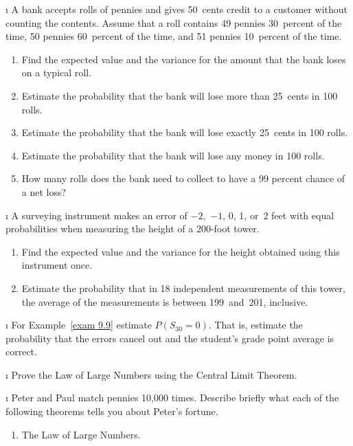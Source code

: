 \begin{LJSItem}
\i\label{exer 9.2.105}  A bank accepts rolls of pennies and gives 50~cents credit to a customer
without counting the contents.  Assume that a roll contains 49 pennies
30~percent of the time, 50 pennies 60~percent of the time, and 51 pennies
10~percent of the time.
\begin{enumerate}
\item  Find the expected value and the variance for the amount that the bank
loses on a typical roll.

\item  Estimate the probability that the bank will lose more than 25~cents in
100 rolls.

\item  Estimate the probability that the bank will lose exactly 25~cents in
100 rolls.

\item  Estimate the probability that the bank will lose any money in 100 rolls.

\item  How many rolls does the bank need to collect to have a 99 percent chance of a net loss?
\end{enumerate}

\i\label{exer 9.2.106}  A surveying instrument makes an error of $-2$,~$-1$, 0, 1, or~2 feet with
equal probabilities when measuring the height of a 200-foot tower.
\begin{enumerate}
\item  Find the expected value and the variance for the height obtained using
this instrument once.

\item  Estimate the probability that in 18 independent measurements of this
tower, the average of the measurements is between 199~and~201, inclusive.
\end{enumerate}

\i\label{exer 9.2.107}  For Example~\ref{exam 9.9} estimate $P(S_{30} = 0)$.  That is,
estimate the probability that the errors cancel out and the student's grade
point average is correct.

\i\label{exer 9.2.108}  Prove the Law of Large Numbers using the Central Limit Theorem.

\i\label{exer 9.2.109}  Peter and Paul match pennies 10{,}000 times.  Describe briefly 
what each of the following theorems tells you about Peter's fortune.
\begin{enumerate}
\item  The Law of Large Numbers.


\end{enumerate}
\end{LJSItem}
